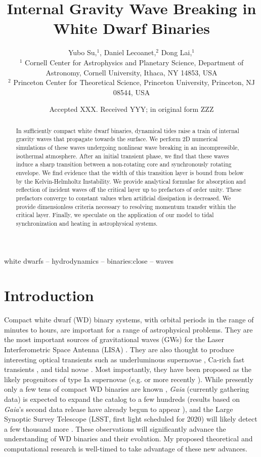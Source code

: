 \documentclass[
        fleqn,
        usenatbib,
    ]{mnras}
\title[Internal Gravity Wave Breaking in White Dwarf Binaries]{Internal Gravity Wave Breaking in White Dwarf Binaries}
\author[Y. Su et\ al.]{
Yubo Su,$^1$,
Daniel Lecoanet,$^2$
Dong Lai,$^1$
\\
$^1$ Cornell Center for Astrophysics and Planetary Science, Department of
Astronomy, Cornell University, Ithaca, NY 14853, USA
\\
$^2$ Princeton Center for Theoretical Science, Princeton University, Princeton,
NJ 08544, USA
}
\date{Accepted XXX\@. Received YYY\@; in original form ZZZ}
\begin{document}
\label{firstpage}
\pagerange{\pageref{firstpage}--\pageref{lastpage}}
\renewcommand*{\sectionautorefname}{Section}
\maketitle


\begin{abstract}
    In sufficiently compact white dwarf binaries, dynamical tides raise a train
    of internal gravity waves that propagate towards the surface. We perform 2D
    numerical simulations of these waves undergoing nonlinear wave breaking in
    an incompressible, isothermal atmosphere. After an initial transient phase,
    we find that these waves induce a sharp transition between a non-rotating
    core and synchronously rotating envelope. We find evidence that the width of
    this transition layer is bound from below by the Kelvin-Helmholtz
    Instability. We provide analytical formulae for absorption and reflection of
    incident waves off the critical layer up to prefactors of order unity. These
    prefactors converge to constant values when artificial dissipation is
    decreased. We provide dimensionless criteria necessary to resolving momentum
    transfer within the critical layer. Finally, we speculate on the application
    of our model to tidal synchronization and heating in astrophysical systems.
\end{abstract}

\begin{keywords}
white dwarfs -- hydrodynamics -- binaries:close -- waves %
\end{keywords}

\section{Introduction}

Compact white dwarf (WD) binary systems, with orbital periods in the range of
minutes to hours, are important for a range of astrophysical problems. They are
the most important sources of gravitational waves (GWs) for the Laser
Interferometric Space Antenna (LISA) \citep{lisa}. They are also thought to
produce interesting optical transients such as underluminous
supernovae \citep{underlum}, Ca-rich fast transients \citep{carich}, and tidal
novae \citep{tidal_novae}. Most importantly, they have been proposed as the likely
progenitors of type Ia supernovae (e.g. \citep{Ia0,webbink} or more
recently \citep{Ia1,Ia2}). While presently only a few tens of compact WD binaries
are known \citep{lsst_wd}, \emph{Gaia} (currently gathering data) is expected to
expand the catalog to a few hundreds \citep{lsst_wd} (results based on
\emph{Gaia}'s second data release have already begun to
appear \citep{gaiaDD,gaiaDD2}), and the Large Synoptic Survey Telescope (LSST,
first light scheduled for 2020) will likely detect a few thousand
more \citep{lsst_wd}. These observations will significantly advance the
understanding of WD binaries and their evolution. My proposed theoretical and
computational research is well-timed to take advantage of these new advances.
\end{document}
